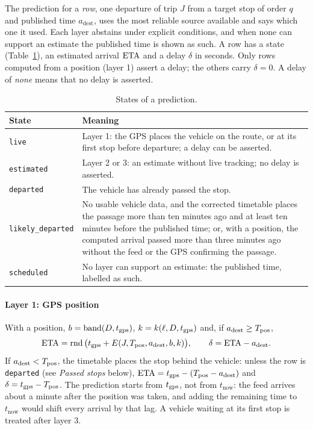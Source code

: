 The prediction for a \emph{row}, one departure of trip $J$ from a target stop of order $q$ and published time
$a_{\mathrm{dest}}$, uses the most reliable source available and says which one it used. Each layer abstains under
explicit conditions, and when none can support an estimate the published time is shown as such. A row has a state
(Table~\ref{tab:states}), an estimated arrival $\mathrm{ETA}$ and a delay $\delta$ in seconds. Only rows computed from a
position (layer 1) assert a delay; the others carry $\delta=0$. A delay of \emph{none} means that no delay is
asserted.

\begin{table}[t]
\centering
\caption{States of a prediction.}
\label{tab:states}
\small
\begin{tabularx}{\textwidth}{@{}lX@{}}
\toprule
State & Meaning \\
\midrule
\texttt{live} & Layer 1: the GPS places the vehicle on the route, or at its first stop before departure; a delay can be
asserted. \\
\texttt{estimated} & Layer 2 or 3: an estimate without live tracking; no delay is asserted. \\
\texttt{departed} & The vehicle has already passed the stop. \\
\texttt{likely\_departed} & No usable vehicle data, and the corrected timetable places the passage more than ten
minutes ago and at least ten minutes before the published time; or, with a position, the computed arrival passed more
than three minutes ago without the feed or the GPS confirming the passage. \\
\texttt{scheduled} & No layer can support an estimate: the published time, labelled as such. \\
\bottomrule
\end{tabularx}
\end{table}

\paragraph{Layer 1: GPS position} With a position, $b=\operatorname{band}(D,t_{\mathrm{gps}})$, $k=k(\ell,D,t_{\mathrm{gps}})$ and, if
$a_{\mathrm{dest}}\ge T_{\mathrm{pos}}$,
\begin{equation}
\mathrm{ETA}=\operatorname{rnd}\big(t_{\mathrm{gps}}+E(J,T_{\mathrm{pos}},a_{\mathrm{dest}},b,k)\big),\qquad \delta=\mathrm{ETA}-a_{\mathrm{dest}}.
\label{eq:layer1}
\end{equation}
If $a_{\mathrm{dest}}<T_{\mathrm{pos}}$, the timetable places the stop behind the vehicle: unless the row is \texttt{departed}
(see \emph{Passed stops} below), $\mathrm{ETA}=t_{\mathrm{gps}}-(T_{\mathrm{pos}}-a_{\mathrm{dest}})$ and $\delta=t_{\mathrm{gps}}-T_{\mathrm{pos}}$. The prediction
starts from $t_{\mathrm{gps}}$, not from $t_{\mathrm{now}}$: the feed arrives about a minute after the position was taken, and
adding the remaining time to $t_{\mathrm{now}}$ would shift every arrival by that lag. A vehicle waiting at its first
stop is treated after layer 3.

